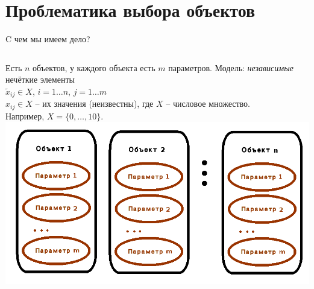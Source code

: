 \section{Проблематика выбора объектов}
\begin{frame}{C чем мы имеем дело?}
 	\begin{columns}
 			Есть $n$ объектов, у каждого объекта %
 			есть $m$ параметров. Модель: {\em независимые} нечёткие элементы 
			\\ \vspace*{2mm}   %
 			$\tilde x_{ij} \in X$, {\footnotesize $i = 1 \ldots n$, $j = 1 \ldots m$} 
 			\\ \vspace*{3mm}
 			$x_{ij} \in X$ -- их значения (неизвестны), где $X$ --  числовое множество.
 			\\ Например, $X = \{0, \ldots, 10\}$. 
 			\includegraphics[width=1.0\linewidth]{./pic/theobjects}
 	\end{columns}
 	

\end{frame}
